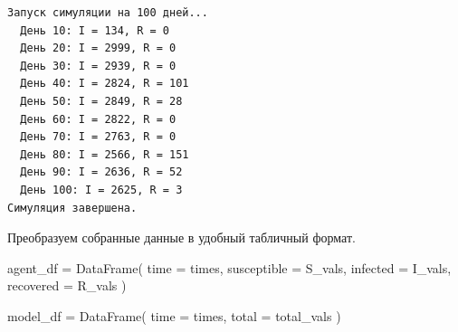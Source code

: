 \documentclass[
  12pt,
  a4paper,
  DIV=11,
  numbers=noendperiod]{scrreprt}
\newenvironment{Shaded}{\begin{snugshade}}{\end{snugshade}}
\newcommand{\CommentTok}[1]{\textcolor[rgb]{0.37,0.37,0.37}{#1}}
\newcommand{\ControlFlowTok}[1]{\textcolor[rgb]{0.00,0.23,0.31}{#1}}
\newcommand{\FloatTok}[1]{\textcolor[rgb]{0.68,0.00,0.00}{#1}}
\newcommand{\FunctionTok}[1]{\textcolor[rgb]{0.28,0.35,0.67}{#1}}
\newcommand{\KeywordTok}[1]{\textcolor[rgb]{0.00,0.23,0.31}{#1}}
\newcommand{\NormalTok}[1]{\textcolor[rgb]{0.00,0.23,0.31}{#1}}
\newcommand{\OperatorTok}[1]{\textcolor[rgb]{0.37,0.37,0.37}{#1}}
\newcommand{\SpecialCharTok}[1]{\textcolor[rgb]{0.37,0.37,0.37}{#1}}
\newcommand{\StringTok}[1]{\textcolor[rgb]{0.13,0.47,0.30}{#1}}
\begin{document}
\begin{Shaded}
\end{Shaded}

\begin{verbatim}
Запуск симуляции на 100 дней...
  День 10: I = 134, R = 0
  День 20: I = 2999, R = 0
  День 30: I = 2939, R = 0
  День 40: I = 2824, R = 101
  День 50: I = 2849, R = 28
  День 60: I = 2822, R = 0
  День 70: I = 2763, R = 0
  День 80: I = 2566, R = 151
  День 90: I = 2636, R = 52
  День 100: I = 2625, R = 3
Симуляция завершена.
\end{verbatim}

Преобразуем собранные данные в удобный табличный формат.

\begin{Shaded}
\begin{Highlighting}[]
\NormalTok{agent\_df }\OperatorTok{=} \FunctionTok{DataFrame}\NormalTok{(}
\NormalTok{    time }\OperatorTok{=}\NormalTok{ times,}
\NormalTok{    susceptible }\OperatorTok{=}\NormalTok{ S\_vals,}
\NormalTok{    infected }\OperatorTok{=}\NormalTok{ I\_vals,}
\NormalTok{    recovered }\OperatorTok{=}\NormalTok{ R\_vals}
\NormalTok{)}

\NormalTok{model\_df }\OperatorTok{=} \FunctionTok{DataFrame}\NormalTok{(}
\NormalTok{    time }\OperatorTok{=}\NormalTok{ times,}
\NormalTok{    total }\OperatorTok{=}\NormalTok{ total\_vals}
\NormalTok{)}
\end{Highlighting}
\end{Shaded}
\end{document}
